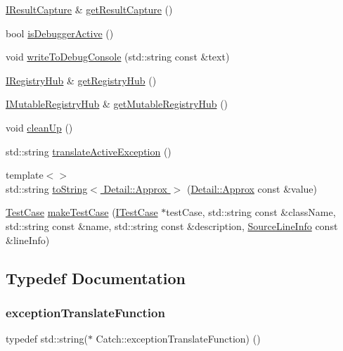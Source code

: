 \begin{DoxyCompactItemize}
\item 
\hyperlink{struct_catch_1_1_i_result_capture}{I\+Result\+Capture} \& \hyperlink{namespace_catch_aff60c1de6ac6cea30175d70e33d83c8e}{get\+Result\+Capture} ()
\item 
bool \hyperlink{namespace_catch_ab079497368fb1df25af39ad494d2a241}{is\+Debugger\+Active} ()
\item 
void \hyperlink{namespace_catch_aa5dcf4750ce9a854f4b74d3c952d13cc}{write\+To\+Debug\+Console} (std\+::string const \&text)
\item 
\hyperlink{struct_catch_1_1_i_registry_hub}{I\+Registry\+Hub} \& \hyperlink{namespace_catch_ac24b072979540bfd922e7d46e899f46f}{get\+Registry\+Hub} ()
\item 
\hyperlink{struct_catch_1_1_i_mutable_registry_hub}{I\+Mutable\+Registry\+Hub} \& \hyperlink{namespace_catch_ac9ddcc6d66079add9cb2a3140b8ae51e}{get\+Mutable\+Registry\+Hub} ()
\item 
void \hyperlink{namespace_catch_a0f78e9afdebc6d4512d18e76fbf54b8c}{clean\+Up} ()
\item 
std\+::string \hyperlink{namespace_catch_adafff91485eeeeb9e9333f317cc0e3b1}{translate\+Active\+Exception} ()
\item 
{\footnotesize template$<$$>$ }\\std\+::string \hyperlink{namespace_catch_ac501c2b6bfe82978d699ddda37c53d13}{to\+String$<$ Detail\+::\+Approx $>$} (\hyperlink{class_catch_1_1_detail_1_1_approx}{Detail\+::\+Approx} const \&value)
\item 
\hyperlink{class_catch_1_1_test_case}{Test\+Case} \hyperlink{namespace_catch_a2a784590bb5068810d3f6013fed1f1d3}{make\+Test\+Case} (\hyperlink{struct_catch_1_1_i_test_case}{I\+Test\+Case} $\ast$test\+Case, std\+::string const \&class\+Name, std\+::string const \&name, std\+::string const \&description, \hyperlink{struct_catch_1_1_source_line_info}{Source\+Line\+Info} const \&line\+Info)
\end{DoxyCompactItemize}


\subsection{Typedef Documentation}
\hypertarget{namespace_catch_a14edb319150d3e108bbdef994f9eec2a}{}\label{namespace_catch_a14edb319150d3e108bbdef994f9eec2a} 
\subsubsection{\texorpdfstring{exception\+Translate\+Function}{exceptionTranslateFunction}}
{\footnotesize\ttfamily typedef std\+::string($\ast$ Catch\+::exception\+Translate\+Function) ()}

